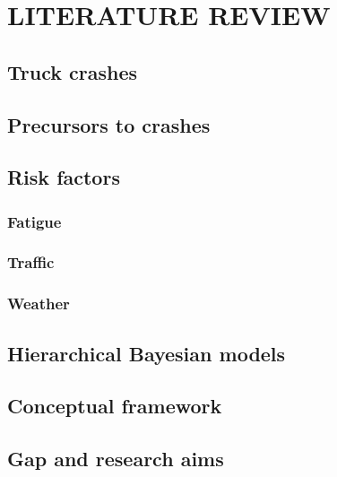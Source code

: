 \documentclass[12pt]{book}
\numberwithin{equation}{chapter}
\begin{document}
\hypertarget{literature-review}{%
\chapter{LITERATURE REVIEW}\label{literature-review}}

\hypertarget{truck-crashes}{%
\section{Truck crashes}\label{truck-crashes}}

\hypertarget{precursors-to-crashes}{%
\section{Precursors to crashes}\label{precursors-to-crashes}}

\hypertarget{risk-factors}{%
\section{Risk factors}\label{risk-factors}}

\hypertarget{fatigue}{%
\subsection{Fatigue}\label{fatigue}}

\hypertarget{traffic}{%
\subsection{Traffic}\label{traffic}}

\hypertarget{weather}{%
\subsection{Weather}\label{weather}}

\hypertarget{hierarchical-bayesian-models}{%
\section{Hierarchical Bayesian models}\label{hierarchical-bayesian-models}}

\hypertarget{conceptual-framework}{%
\section{Conceptual framework}\label{conceptual-framework}}

\hypertarget{gap-and-research-aims}{%
\section{Gap and research aims}\label{gap-and-research-aims}}
\end{document}
